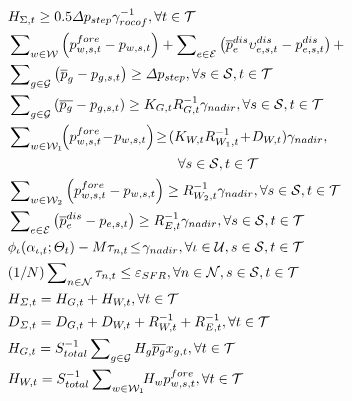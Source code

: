 \documentclass[lettersize,journal]{IEEEtran}
\newenvironment{newsubequations}{\small\begin{subequations}}{\end{subequations}}
\begin{document}
\begin{newsubequations}\label{eqn:19}
\begin{align}
& H_{\Sigma,t} \geq 0.5{\varDelta p_{{step} }}{{\gamma}_{rocof}^{-1}},\forall  t\in\mathcal{T}\,\,\label{19-a}\\
&\sum\nolimits_{w\in\mathcal{W}} \left({p^{fore}_{w,s,t}} - p_{w,s, t} \right) + \sum\nolimits_{e\in\mathcal{E}} \left( \overline{p}_{e}^{dis} \upsilon_{e,s, t}^{dis} -p_{e,s, t}^{{dis}}\right) +\notag \\
&\sum\nolimits_{g\in\mathcal{G}} \left( \overline{p}_{g} -p_{g,s, t}\right) \geq \varDelta p_{step}, \forall s\in\mathcal{S}, t\in\mathcal{T} \label{19-b}\\
& \sum\nolimits_{g\in\mathcal{G}} \left( \overline{p_{g}} - p_{g,s, t} \right) \geq K_{G,t} R_{G,t}^{-1} \gamma_{nadir}, \forall s\in\mathcal{S},t\in\mathcal{T}\label{19-c}\\
& \sum\nolimits_{w\in\mathcal{W}_1} \!\! \left({p^{fore}_{w,s,t}} \!-\! p_{w,s, t} \right) \!\geq\! (K_{W,t} R_{W_1,t}^{-1} \!+\! D_{W,t})\gamma_{nadir}, \label{19-d}\\
& \qquad \qquad \qquad \qquad \qquad \qquad\, \forall s\in\mathcal{S},t\in\mathcal{T} \notag \\
& \sum\nolimits_{w\in\mathcal{W}_2} \left({p^{fore}_{w,s,t}} - p_{w, s, t} \right) \geq R_{W_2,t}^{-1} \gamma_{nadir}, \forall s\in\mathcal{S},t\in\mathcal{T} \label{19-e}\\
& \sum\nolimits_{e\in\mathcal{E}} \left( \overline{p}_{e}^{dis} - p_{e,s, t} \right) \geq R_{E,t}^{-1} \gamma_{nadir}, \forall s\in\mathcal{S},t\in\mathcal{T} \label{19-f}\\
& \phi_{\iota}(\alpha_{\iota,t}; \varTheta_{t}) - M\tau_{n,t}\! \leq \!\gamma_{nadir},\forall \iota\in\mathcal{U},s\in\mathcal{S},t\in\mathcal{T}\label{19-g}\\
& ({1}/{{N}})\sum\nolimits_{n\in\mathcal{N}}\tau_{n,t} \leq \varepsilon_{SFR},\forall n\in\mathcal{N},s\in\mathcal{S},t\in\mathcal{T}\label{19-h}\\
& H_{\varSigma,t} =  H_{G,t} + H_{W,t},\forall t\in\mathcal{T} \label{19-i} \\
& D_{\varSigma,t} =  D_{G,t} + D_{W,t} + R_{W,t}^{-1} + R_{E,t}^{-1}, \forall t \in\mathcal{T} \label{19-j}       \\
& H_{G,t} =  S_{total}^{-1} \sum\nolimits_{g \in\mathcal{G}}H_{g}\overline{p_{g}} x_{g,t},\forall t\in\mathcal{T} \label{19-k} \\
& H_{W,t} =  S_{total}^{-1} \sum\nolimits_{w \in\mathcal{W}_1} \!\! H_{w} p_{w,s,t}^{fore},\forall t\in\mathcal{T} \label{19-l} \\

\end{align}
\end{newsubequations}
\end{document}
